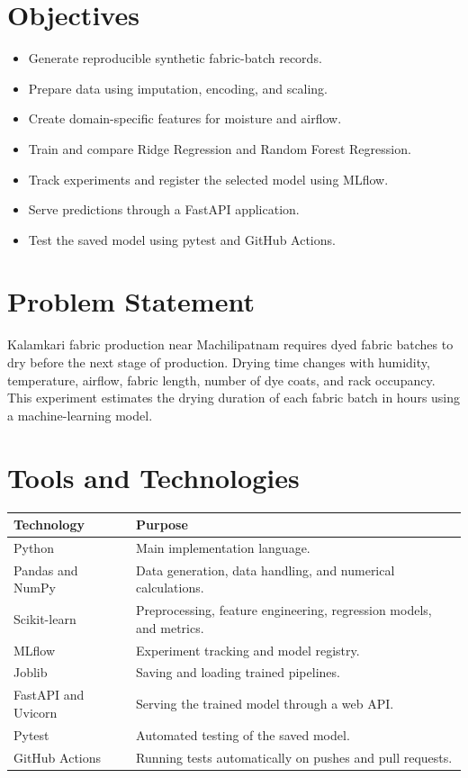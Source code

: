 \documentclass[12pt,a4paper]{article}
\begin{document}
\section*{Objectives}
\begin{itemize}[leftmargin=*]
    \item Generate reproducible synthetic fabric-batch records.
    \item Prepare data using imputation, encoding, and scaling.
    \item Create domain-specific features for moisture and airflow.
    \item Train and compare Ridge Regression and Random Forest Regression.
    \item Track experiments and register the selected model using MLflow.
    \item Serve predictions through a FastAPI application.
    \item Test the saved model using pytest and GitHub Actions.
\end{itemize}

\section*{Problem Statement}
Kalamkari fabric production near Machilipatnam requires dyed fabric batches to dry before the next stage of production. Drying time changes with humidity, temperature, airflow, fabric length, number of dye coats, and rack occupancy. This experiment estimates the drying duration of each fabric batch in hours using a machine-learning model.

\newpage

\section{Tools and Technologies}
\begin{longtable}{p{}p{}}
\toprule
\textbf{Technology} & \textbf{Purpose} \\
\midrule
Python & Main implementation language. \\
Pandas and NumPy & Data generation, data handling, and numerical calculations. \\
Scikit-learn & Preprocessing, feature engineering, regression models, and metrics. \\
MLflow & Experiment tracking and model registry. \\
Joblib & Saving and loading trained pipelines. \\
FastAPI and Uvicorn & Serving the trained model through a web API. \\
Pytest & Automated testing of the saved model. \\
GitHub Actions & Running tests automatically on pushes and pull requests. \\
\bottomrule
\end{longtable}
\end{document}
